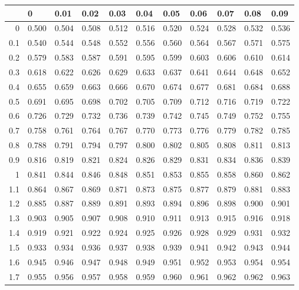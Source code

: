 \documentclass[11pt, chapterprefix=true]{scrbook}\usepackage[]{graphicx}\usepackage[]{color}
\begin{document}
\begin{table}[ht]
\centering
\begin{tabular}{rllllllllll}
  \hline
 & 0 & 0.01 & 0.02 & 0.03 & 0.04 & 0.05 & 0.06 & 0.07 & 0.08 & 0.09 \\ 
  \hline
0 & 0.500 & 0.504 & 0.508 & 0.512 & 0.516 & 0.520 & 0.524 & 0.528 & 0.532 & 0.536 \\ 
  0.1 & 0.540 & 0.544 & 0.548 & 0.552 & 0.556 & 0.560 & 0.564 & 0.567 & 0.571 & 0.575 \\ 
  0.2 & 0.579 & 0.583 & 0.587 & 0.591 & 0.595 & 0.599 & 0.603 & 0.606 & 0.610 & 0.614 \\ 
  0.3 & 0.618 & 0.622 & 0.626 & 0.629 & 0.633 & 0.637 & 0.641 & 0.644 & 0.648 & 0.652 \\ 
  0.4 & 0.655 & 0.659 & 0.663 & 0.666 & 0.670 & 0.674 & 0.677 & 0.681 & 0.684 & 0.688 \\ 
  0.5 & 0.691 & 0.695 & 0.698 & 0.702 & 0.705 & 0.709 & 0.712 & 0.716 & 0.719 & 0.722 \\ 
  0.6 & 0.726 & 0.729 & 0.732 & 0.736 & 0.739 & 0.742 & 0.745 & 0.749 & 0.752 & 0.755 \\ 
  0.7 & 0.758 & 0.761 & 0.764 & 0.767 & 0.770 & 0.773 & 0.776 & 0.779 & 0.782 & 0.785 \\ 
  0.8 & 0.788 & 0.791 & 0.794 & 0.797 & 0.800 & 0.802 & 0.805 & 0.808 & 0.811 & 0.813 \\ 
  0.9 & 0.816 & 0.819 & 0.821 & 0.824 & 0.826 & 0.829 & 0.831 & 0.834 & 0.836 & 0.839 \\ 
  1 & 0.841 & 0.844 & 0.846 & 0.848 & 0.851 & 0.853 & 0.855 & 0.858 & 0.860 & 0.862 \\ 
  1.1 & 0.864 & 0.867 & 0.869 & 0.871 & 0.873 & 0.875 & 0.877 & 0.879 & 0.881 & 0.883 \\ 
  1.2 & 0.885 & 0.887 & 0.889 & 0.891 & 0.893 & 0.894 & 0.896 & 0.898 & 0.900 & 0.901 \\ 
  1.3 & 0.903 & 0.905 & 0.907 & 0.908 & 0.910 & 0.911 & 0.913 & 0.915 & 0.916 & 0.918 \\ 
  1.4 & 0.919 & 0.921 & 0.922 & 0.924 & 0.925 & 0.926 & 0.928 & 0.929 & 0.931 & 0.932 \\ 
  1.5 & 0.933 & 0.934 & 0.936 & 0.937 & 0.938 & 0.939 & 0.941 & 0.942 & 0.943 & 0.944 \\ 
  1.6 & 0.945 & 0.946 & 0.947 & 0.948 & 0.949 & 0.951 & 0.952 & 0.953 & 0.954 & 0.954 \\ 
  1.7 & 0.955 & 0.956 & 0.957 & 0.958 & 0.959 & 0.960 & 0.961 & 0.962 & 0.962 & 0.963 \\ 

\end{tabular}
\end{table}
\end{document}

